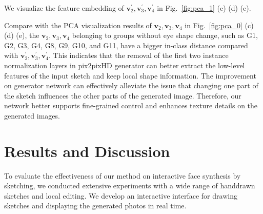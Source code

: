 \documentclass{article}
\begin{document}
We visualize the feature embedding of $\boldsymbol{v}_2^{'},\boldsymbol{v}^{'}_3, \boldsymbol{v}_4^{'}$ in 
Fig.~\ref{fig:pca_1} (c) (d) (e). 

Compare with the PCA visualization results of $\boldsymbol{v}_2,\boldsymbol{v}_3,\boldsymbol{v}_4$ in 
Fig.~\ref{fig:pca_0} (c) (d) (e), the $\boldsymbol{v}_2, \boldsymbol{v}_3, \boldsymbol{v}_4$ belonging to groups without eye shape change, such as G1, G2, G3, G4, G8, G9, G10, and G11, have a bigger in-class distance compared with $\boldsymbol{v}_2^{'}, \boldsymbol{v}_3^{'}, \boldsymbol{v}_4^{'}$. 
This indicates that the removal of the first two instance normalization layers in pix2pixHD generator can better extract the low-level features of the input sketch and keep local shape information. 
The improvement on generator network can effectively alleviate the issue that changing one part of the sketch influences the other parts of the generated image. 
Therefore, our network better supports fine-grained control and enhances texture details on the generated images.


\section{Results and Discussion}

To evaluate the effectiveness of our method on interactive face synthesis by sketching, we conducted extensive experiments with a wide range of handdrawn sketches and local editing. 
We develop an interactive interface for drawing sketches and displaying the generated photos in real time.


\end{document}
